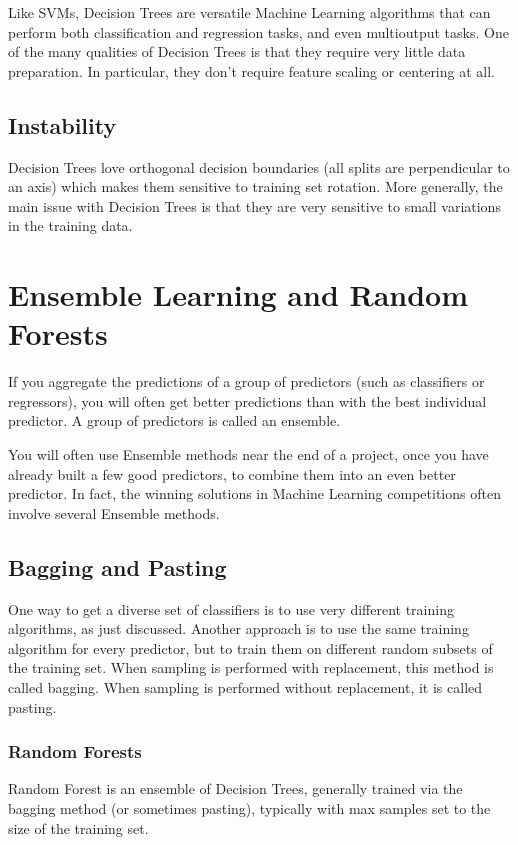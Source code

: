 \documentclass[french]{article}
\begin{document}
Like SVMs, Decision Trees are versatile Machine Learning algorithms that can perform both classification and regression tasks, and even multioutput tasks. One of the many qualities of Decision Trees is that they require very little data preparation. In particular, they don’t require feature scaling or centering at all.

\subsection{Instability}
Decision Trees love orthogonal decision boundaries (all splits are perpendicular to an axis) which makes them sensitive to training set rotation. More generally, the main issue with Decision Trees is that they are very sensitive to small variations in the training data.

\section{Ensemble Learning and Random Forests}

If you aggregate the predictions of a group of predictors (such as classifiers or regressors), you will often get better predictions than with the best individual predictor. A group of predictors is called an ensemble.

You will often use Ensemble methods near the end of a project, once you have already built a few good predictors, to combine them into an even better predictor. In fact, the winning solutions in Machine Learning competitions often involve several Ensemble methods.

\subsection{Bagging and Pasting}

One way to get a diverse set of classifiers is to use very different training algorithms, as just discussed. Another approach is to use the same training algorithm for every predictor, but to train them on different random subsets of the training set.
When sampling is performed with replacement, this method is called bagging. When sampling is performed without replacement, it is called pasting.

\subsubsection{Random Forests}

Random Forest is an ensemble of Decision Trees, generally trained via the bagging method (or sometimes pasting), typically with max samples set to the size of the training set.
\end{document}
